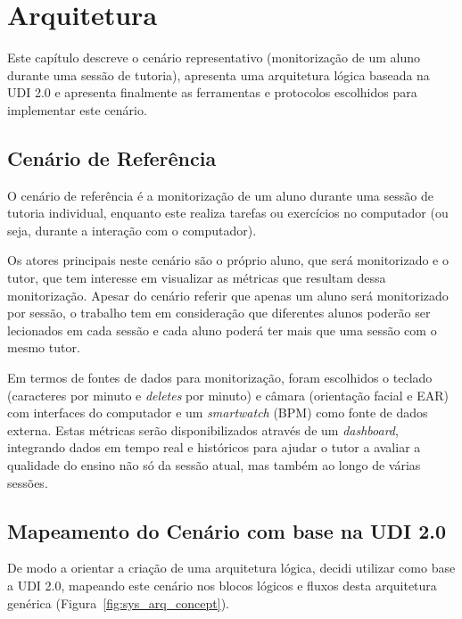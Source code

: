 \chapter{Arquitetura}
\label{chap:arquitetura}

\begin{introduction}
Este capítulo descreve o cenário representativo (monitorização de um aluno durante uma sessão de tutoria), apresenta uma arquitetura lógica baseada na \ac{UDI 2.0} e apresenta finalmente as ferramentas e protocolos escolhidos para implementar este cenário.
\end{introduction}

\section{Cenário de Referência}\label{sec:scenario_arquitecture}

O cenário de referência é a monitorização de um aluno durante uma sessão de tutoria individual, enquanto este realiza tarefas ou exercícios no computador (ou seja, durante a interação com o computador).

Os atores principais neste cenário são o próprio aluno, que será monitorizado e o tutor, que tem interesse em visualizar as métricas que resultam dessa monitorização.
Apesar do cenário referir que apenas um aluno será monitorizado por sessão, o trabalho tem em consideração que diferentes alunos poderão ser lecionados em cada sessão e cada aluno poderá ter mais que uma sessão com o mesmo tutor.

Em termos de fontes de dados para monitorização, foram escolhidos o teclado (caracteres por minuto e \textit{deletes} por minuto) e câmara (orientação facial e \ac{EAR}) com interfaces do computador e um \textit{smartwatch} (\ac{BPM}) como fonte de dados externa.
Estas métricas serão disponibilizados através de um \textit{dashboard}, integrando dados em tempo real e históricos para ajudar o tutor a avaliar a qualidade do ensino não só da sessão atual, mas também ao longo de várias sessões.

\section{Mapeamento do Cenário com base na \ac{UDI 2.0}}

De modo a orientar a criação de uma arquitetura lógica, decidi utilizar como base a \ac{UDI 2.0}, mapeando este cenário nos blocos lógicos e fluxos desta arquitetura genérica (Figura~\ref{fig:sys_arq_concept}).

